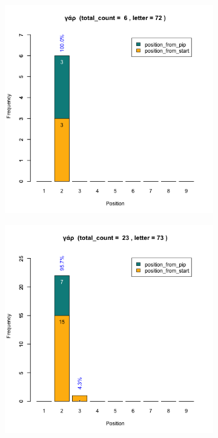 \documentclass[a4paper]{article}
\begin{document}
\begin{figure}
\begin{subfigure}{0.45\textwidth}
\centering
\includegraphics[width=1\linewidth]{../../data/output/paul_R_par/plots/par1_lt72.png}
\end{subfigure}
\begin{subfigure}{0.45\textwidth}
\centering
\includegraphics[width=1\linewidth]{../../data/output/paul_R_par/plots/par1_lt73.png}

\end{subfigure}
\end{figure}
\end{document}
